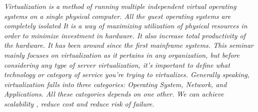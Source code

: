 \emph{Virtualization is a method of running multiple independent virtual operating systems
on a single physical computer. All the guest operating systems are completely isolated
It is a way of maximizing utilization of physical resources in order to minimize
investment in hardware. It also increase total productivity of the hardware. It has
been around since the first mainframe systems. This seminar mainly focuses on
virtualization as it pertains in any organization, but before considering any type of
server virtualization, it's important to define what technology or category of service
you're trying to virtualizes. Generally speaking, virtualization falls into three
categories: Operating System, Network, and Applications. All these categories
depends on one other. We can achieve scalability , reduce cost and reduce risk of
failure.}
